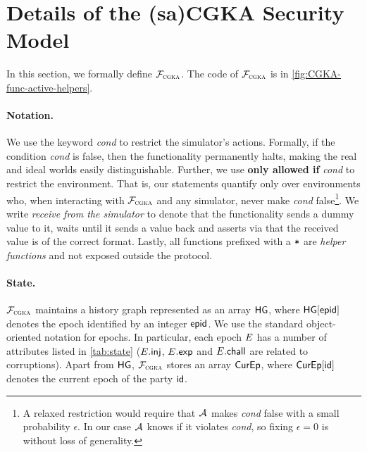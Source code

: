 
\section{Details of the (sa)CGKA Security Model}\label{sec:model}
In this section, we formally define $\mathcal{F}_{\normalfont\textsc{cgka}}$. The code of $\mathcal{F}_{\normalfont\textsc{cgka}}$ is in \cref{fig:CGKA-func-active-helpers}.

%
\paragraph{Notation.}
We use the keyword \KwAss{} \textit{cond} to restrict the simulator's actions. Formally, if the condition \textit{cond}
is false, then the functionality permanently halts, making the real and ideal worlds easily distinguishable. Further, we
use {\bf only allowed if} \textit{cond} to restrict the environment. That is, our statements quantify only over
environments who, when interacting with $\mathcal{F}_{\normalfont\textsc{cgka}}$ and any simulator, never make \textit{cond} false\footnote{A relaxed
  restriction would require that $\mathcal{A}_{\relax}$ makes \textit{cond} false with a small probability $\epsilon$. In our case
  $\mathcal{A}_{\relax}$ knows if it violates \textit{cond}, so fixing $\epsilon=0$ is without loss of generality.}.
We write \emph{receive from the simulator} to denote that the functionality sends a dummy value to it, waits
until it sends a value back and asserts via \KwAss{} that the received value is of the correct format. Lastly, all
functions prefixed with a ${\textnormal{\tt*}}$ are \emph{helper functions} and not exposed outside the protocol.

\paragraph{State.}
$\mathcal{F}_{\normalfont\textsc{cgka}}$ maintains a history graph represented as an array $\mathsf{HG}$, where $\mathsf{HG}[{\normalfont\textsf{epid}}]$ denotes the epoch identified by an integer ${\normalfont\textsf{epid}}$. We use the standard object-oriented notation for epochs. In particular, each epoch $E$ has a number of attributes listed in \cref{tab:state} ($E.\textsf{inj}$, $E.\mathsf{exp}$ and $E.\mathsf{chall}$ are related to corruptions).
 Apart from $\mathsf{HG}$, $\mathcal{F}_{\normalfont\textsc{cgka}}$ stores an array $\textsf{CurEp}$, where $\textsf{CurEp}[{\mathsf{id}}]$ denotes the current epoch of the party ${\mathsf{id}}$.

